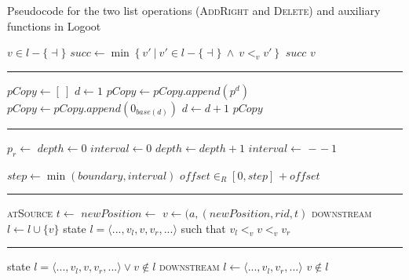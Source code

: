 \documentclass[diss.tex]{subfiles}
\begin{document}
\begin{algorithm}[H]
\caption{Pseudocode for the two list operations (\textsc{AddRight} and \textsc{Delete}) and auxiliary functions  in Logoot}
\label{alg:logoot}
\begin{algorithmic}[1]
\Require $v \in l - \{\dashv\}$
  
\State $succ \gets \min \left\{ v' ~|~ v' \in l -\{\dashv\} ~\wedge~ v <_v v'  \right\}$
\State \Return $succ$
\Else
\State \Return $v$
\EndIf
\EndFunction
\end{algorithmic}

\hrule

\begin{algorithmic}[1]
 \Comment{}
\State $pCopy \gets [~]$
\State $d \gets 1$
$pCopy \gets pCopy.append(p^d)$
\Else{}
$pCopy \gets pCopy.append(0_{base(d)})$ 
\EndIf
\State $d \gets d+1$
\EndWhile
\Return $pCopy$
\EndFunction
\end{algorithmic}

\hrule

\begin{algorithmic}[1]
\State $p_r \gets $ 
\State $depth \gets 0$
\State $interval \gets 0$
\State $depth \gets depth + 1$
\State $interval \gets $  $ - $  $-~1$ 
\EndWhile

\State $step \gets \min(boundary, interval)$ 
\State $o\!f\!f\!set \in_R [0, step]$
\State \Return {} $ +~ o\!f\!f\!set$
\EndFunction
\end{algorithmic}

\hrule

\begin{algorithmic}[1]
\BState \textsc{atSource}
\State $t \gets $  
\State $newPosition \gets $
\State $v \gets (a, (newPosition, rid, t)$
\BState \textsc{downstream}
\State $l \gets l \cup \{v\}$
\EndFunction
\Ensure state $l = \langle ..., v_l, v, v_r, ... \rangle$ such that $v_l <_v v <_v v_r$
\end{algorithmic}

\hrule

\begin{algorithmic}[1]

\Require state $l = \langle ..., v_l, v, v_r, ... \rangle \vee v \notin l$
\BState \textsc{downstream}
\State $l \gets \langle ..., v_l, v_r, ... \rangle$
\EndIf
\EndFunction
\Ensure $v \notin l$
\end{algorithmic}
\end{algorithm}
\end{document}
